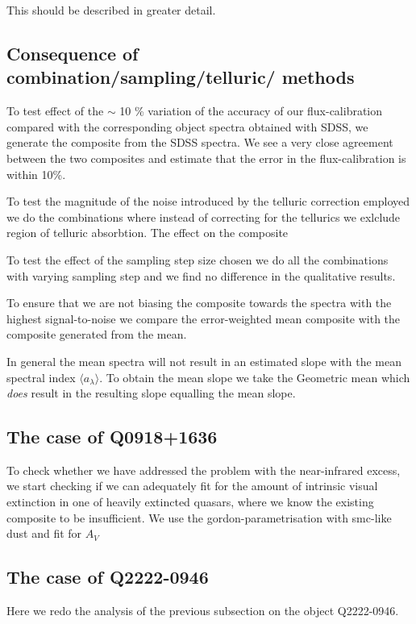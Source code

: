\documentclass[iop]{emulateapj}
\begin{document}
 This should be described in greater detail.

\subsection{Consequence of combination/sampling/telluric/ methods}
To test effect of the $\sim$ 10 \% variation of the accuracy of our flux-calibration compared with the corresponding object spectra obtained with SDSS, we generate the composite from the SDSS spectra. We see a very close agreement between the two composites and estimate that the error in the flux-calibration is within 10\%.

To test the magnitude of the noise introduced by the telluric correction employed we do the combinations where instead of correcting for the tellurics we exlclude region of telluric absorbtion. The effect on the composite  

To test the effect of the sampling step size chosen we do all the combinations with varying sampling step and we find no difference in the qualitative results. 



 To ensure that we are not biasing the composite towards the spectra with the highest signal-to-noise we compare the error-weighted mean composite with the composite generated from the mean.
 
  
In general the mean spectra will not result in an estimated slope with the mean spectral index $\langle a_\lambda\rangle$. To obtain the mean slope we take the Geometric mean which \textit{does} result in the resulting slope equalling the mean slope. 





\subsection{The case of Q0918+1636}
To check whether we have addressed the problem
 with the near-infrared excess, we start checking if we can adequately fit for the amount of intrinsic visual extinction in one of heavily extincted quasars, where we know the existing composite to be insufficient. We use the gordon-parametrisation with smc-like dust and fit for $A_V$
 
 \subsection{The case of Q2222-0946}
Here we redo the analysis of the previous subsection on the object Q2222-0946.
\end{document}
